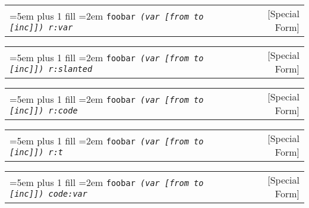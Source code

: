 \documentclass{book}
\newcommand\GNUTexinfocommandstyletextvar[1]{{\normalfont{}\textsl{#1}}}%
\begin{document}
%

\noindent\begin{tabularx}{\linewidth}{@{}Xr}
\rightskip=5em plus 1 fill
\hangindent=2em
\texttt{foobar \EmbracOn{}\textnormal{\textsl{(var \EmbracOff{}\textnormal{\GNUTexinfocommandstyletextvar{[}}\EmbracOn{}from to \EmbracOff{}\textnormal{\GNUTexinfocommandstyletextvar{[}}\EmbracOn{}inc\EmbracOff{}\textnormal{\GNUTexinfocommandstyletextvar{]]}}\EmbracOn{}) r:var}}\EmbracOff{}}& [Special Form]
\end{tabularx}

%

\noindent\begin{tabularx}{\linewidth}{@{}Xr}
\rightskip=5em plus 1 fill
\hangindent=2em
\texttt{foobar \EmbracOn{}\textnormal{\textsl{(var \EmbracOff{}\textnormal{\textsl{[}}\EmbracOn{}from to \EmbracOff{}\textnormal{\textsl{[}}\EmbracOn{}inc\EmbracOff{}\textnormal{\textsl{]]}}\EmbracOn{}) r:slanted}}\EmbracOff{}}& [Special Form]
\end{tabularx}

%

\noindent\begin{tabularx}{\linewidth}{@{}Xr}
\rightskip=5em plus 1 fill
\hangindent=2em
\texttt{foobar \EmbracOn{}\textnormal{\textsl{(var \EmbracOff{}\textnormal{\texttt{[}}\EmbracOn{}from to \EmbracOff{}\textnormal{\texttt{[}}\EmbracOn{}inc\EmbracOff{}\textnormal{\texttt{]]}}\EmbracOn{}) r:code}}\EmbracOff{}}& [Special Form]
\end{tabularx}

%

\noindent\begin{tabularx}{\linewidth}{@{}Xr}
\rightskip=5em plus 1 fill
\hangindent=2em
\texttt{foobar \EmbracOn{}\textnormal{\textsl{(var \EmbracOff{}\textnormal{\texttt{[}}\EmbracOn{}from to \EmbracOff{}\textnormal{\texttt{[}}\EmbracOn{}inc\EmbracOff{}\textnormal{\texttt{]]}}\EmbracOn{}) r:t}}\EmbracOff{}}& [Special Form]
\end{tabularx}

%

\noindent\begin{tabularx}{\linewidth}{@{}Xr}
\rightskip=5em plus 1 fill
\hangindent=2em
\texttt{foobar \EmbracOn{}\textnormal{\textsl{(var \texttt{\GNUTexinfocommandstyletextvar{[}}from to \texttt{\GNUTexinfocommandstyletextvar{[}}inc\texttt{\GNUTexinfocommandstyletextvar{]]}}) code:var}}\EmbracOff{}}& [Special Form]
\end{tabularx}
\end{document}
